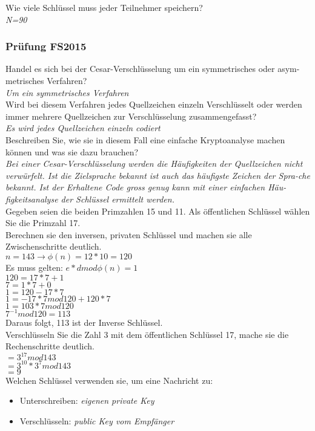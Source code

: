 Wie viele Schlüssel muss jeder Teilnehmer speichern?\\
\textit{N=90}\\

\subsubsection{Prüfung FS2015}
Handel es sich bei der Cesar-Verschlüsselung um ein symmetrisches oder asym-metrisches Verfahren?\\
\textit{Um ein symmetrisches Verfahren}\\

Wird bei diesem Verfahren jedes Quellzeichen einzeln Verschlüsselt oder werden immer mehrere Quellzeichen zur Verschlüsselung zusammengefasst?\\
\textit{Es wird jedes Quellzeichen einzeln codiert}\\

Beschreiben Sie, wie sie in diesem Fall eine einfache Kryptoanalyse machen können und was sie dazu brauchen?\\
\textit{Bei einer Cesar-Verschlüsselung werden die Häufigkeiten der Quellzeichen nicht verwürfelt. Ist die Zielsprache bekannt ist auch das häufigste Zeichen der Spra-che bekannt. Ist der Erhaltene Code gross genug kann mit einer einfachen Häu-figkeitsanalyse der Schlüssel ermittelt werden.}\\

Gegeben seien die beiden Primzahlen 15 und 11. Als öffentlichen Schlüssel wählen Sie die Primzahl 17.\\
Berechnen sie den inversen, privaten Schlüssel und machen sie alle Zwischenschritte deutlich.\\
$n = 143 \rightarrow \phi(n)=12*10=120$\\
Es muss gelten: $e*d mod \phi(n) = 1$\\
$120=17*7+1$\\
$7=1*7+0$\\

$1=120-17*7$\\
$1=-17*7mod120 + 120 * 7$\\
$1=103*7mod120$\\
$7^{-1}mod120=113$\\

Daraus folgt, 113 ist der Inverse Schlüssel.\\

Verschlüsseln Sie die Zahl 3 mit dem öffentlichen Schlüssel 17, mache sie die Rechenschritte deutlich.\\
$=3^{17}mod143$\\
$=3^{10}*3^7mod143$\\
$=9$\\

Welchen Schlüssel verwenden sie, um eine Nachricht zu:\\
\begin{itemize}
    \item Unterschreiben: \textit{eigenen private Key}
    \item Verschlüsseln: \textit{public Key vom Empfänger}
\end{itemize}